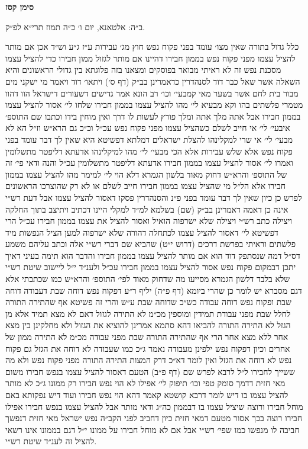 \documentclass[12pt, openany]{book}
\newcommand{\chapname}{}
\newcommand{\newchap}[1]{
	\addcontentsline{toc}{chapter}{#1}
	\renewcommand{\chapname}{#1}
		\begin{center}
			\textbf{%
\fontsize{16pt}{16pt}\selectfont
				#1}
		\end{center}
}
\begin{document}
\newchap{סימן קסז}
\begin{multicols}{2}
ב״ה: אלטאנא, יום ו׳ כ״ה תמוז תרי״א לפ״ק.\\\vspace{0pt}

כלל גדול בתורה שאין מצו׳ עומד בפני פקוח נפש חוץ מג׳ עבירות ע״ז ג״ע וש״ד אכן אם מותר להציל עצמו מפני פקוח נפש בממון חבירו דהיינו אם מותר לגזול ממון חבירו כדי להציל עצמו מסכנת נפש זה לא ראיתי מבואר בפוסקים ומצאנו בזה פלוגתא בין גדולי הראשונים והיא השאלה אשר שאל כבר דוד לסנהדרין כדאמרינן בב״ק (דף ס׳) ויתאו׳ דוד ויאמר מי ישקני מים מבור בית לחם אשר בשער מאי קמבעי׳ וכו׳ רב הונא אמר גדישים דשעורים דישראל הוו דהוו מטמרי פלשתים בהו וקא מבעיא לי׳ מהו להציל עצמו בממון חבירו שלחו לי׳ אסור להציל עצמו בממון חבירו אבל אתה מלך אתה ומלך פורץ לעשות לו דרך ואין מוחין בידו וכתבו שם התוספ׳ איבעי׳ לי׳ אי חייב לשלם כשהציל עצמו מפני פקוח נפש עכ״ל וכ״כ גם הרא״ש וז״ל הא לא מבעי׳ לי׳ אי שרי למקלינהו להצלת ישראלים דמלתא דפשיטא היא שאין לך דבר עומד בפני פקוח נפש אלא שלש עבירות אלא הכי מבעי׳ לי׳ מהו למיקלינהו אדעתא דליפטר מתשלומין ואמרו לי׳ אסור להציל עצמו בממון חבירו אדעתא דליפטר מתשלומין עכ״ל והנה ודאי פי׳ זה של התוספ׳ והרא״ש דחוק מאוד בלשון הגמרא דלא הוי לי׳ למימר מהו להציל עצמו בממון חבירו אלא הל״ל מי שהציל עצמו בממון חבירו חייב לשלם או לא רק שהוצרכו הראשונים לפרש כן כיון שאין לך דבר עומד בפני פ״נ והסנהדרין פסקו דאסור להציל עצמו אבל דעת רש״י אינה כן דאמה דאמרינן בב״ק (שם) בשלמא למ״ד למקלי היינו דכתיב ויתיצב בתוך החלקה ויצילה כתב רש״י ויצילה שלא ישרפוה הואיל ואסור להציל את עצמו בממון חבירו עכ״ל הרי דפשיטא לי׳ דאסור להציל עצמו לכתחלה דהורה שלא ישרפוה למען הציל הנפשות מיד פלשתים וראיתי בפרשת דרכים (דרוש י״ט) שהביא שם דברי רש״י אלה וכתב עליהם משמע דס״ל דמה שנסתפק דוד הוא אם מותר להציל עצמו בממון חבירו והדבר הוא תימה בעיני דאיך יתכן דבמקום פקוח נפש אסור להציל עצמו בממון חבירו עכ״ל ולענ״ד י״ל ליישוב שיטת רש״י שלא בלבד דלשון הגמרא מסייעו מה שדחוק מאוד לפי׳ התוספ׳ והרא״ש כמו שכתבתי אלא דגם מסברא יש לומר כן שהרי ביומא (דף פ״ה) יליף ר״ע דפקוח נפש דוחה שבת דעבודה דוחה שבת ופקוח נפש דוחה עבודה כש״כ שדוחה שבת ע״ש והרי זה פשיטא אף שהתירה התורה לחלל שבת מפני עבודת תמידין ומוספין מכ״מ לא התירה לגזול דאם לא מצא תמיד אלא מן הגזל לא התירה התורה להביאו דהא סתמא אמרינן להוציא את הגזול ולא מחלקינן בין מצא אחר ללא מצא אחר הרי אף שהתירה התורה שבת מפני עבודה מכ״מ לא התירה ממון של אחרים וכיון דפקוח נפש ילפינן מעבודה נאמר ג״כ כמו שעבודה לא דוחה את הגזל גם פקוח נפש לא דוחה את הגזל ואין לומר דא״כ דרק המצות התירה התורה מפני פקוח נפש ולא מה ששייך לחבירו ל״ל לרבא לפרש שם (דף פ״ב) הטעם דאסור להציל עצמו בנפש חבירו משום מאי חזית דדמך סומק טפי וכו׳ תיפוק לי׳ אפילו לא הוי נפש חבירו רק ממונו ג״כ לא מותר להציל עצמו בו דיש לומר דרבא קושטא קאמר דהא הוי נפש חבירו ועוד דיש נפקותא באם מוחל חבירו ורוצה שיציל עצמו בו דבממון כה״ג ודאי מותר אבל להציל עצמו בנפש חבירו אפילו חבירו רוצה בכך אסור מטעם דמאי חזית כיון דחביב לפני הקב״ה נפש ישראל מאי חזית דנפשך חביבה לו מנפשו כמו שפי׳ רש״י אבל אם לא מוחל חבירו על ממונו י״ל דגם בממונו אינו רשאי להציל זה לענ״ד שיטת רש״י.\\\vspace{0pt}


\end{multicols}
\end{document}
